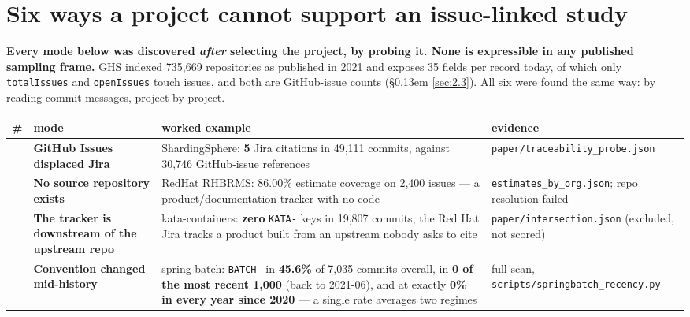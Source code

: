 \documentclass[conference]{IEEEtran}
\begin{document}
\section{Six ways a project cannot support an issue-linked study}
\label{sec:5}

\textbf{Every mode below was discovered \emph{after} selecting the project, by probing it. None is expressible in any published sampling frame.} GHS indexed 735,669 repositories as published in 2021 and exposes 35 fields per record today, of which only \texttt{totalIssues} and \texttt{openIssues} touch issues, and both are GitHub-issue counts (\S\kern0.13em \ref{sec:2.3}). All six were found the same way: by reading commit messages, project by project.

\begin{table}[htbp]
\centering
\begingroup\footnotesize\setlength{\tabcolsep}{3pt}
\begin{tabular}{>{\raggedright\arraybackslash}p{}>{\raggedright\arraybackslash}p{}>{\raggedright\arraybackslash}p{}>{\raggedright\arraybackslash}p{}}
\toprule
\textbf{\#} & \textbf{mode} & \textbf{worked example} & \textbf{evidence} \\
\midrule
1 & \textbf{GitHub Issues displaced Jira} & ShardingSphere: \textbf{5} Jira citations in 49,111 commits, against 30,746 GitHub-\allowbreak{}issue references & \texttt{paper/\allowbreak{}traceability\_\allowbreak{}probe.\allowbreak{}json} \\
2 & \textbf{No source repository exists} & RedHat RHBRMS: 86.00\% estimate coverage on 2,400 issues --- a product/\allowbreak{}documentation tracker with no code & \texttt{estimates\_\allowbreak{}by\_\allowbreak{}org.\allowbreak{}json}; repo resolution failed \\
3 & \textbf{The tracker is downstream of the upstream repo} & kata-\allowbreak{}containers: \textbf{zero} \texttt{KATA-\allowbreak{}} keys in 19,807 commits; the Red Hat Jira tracks a product built from an upstream nobody asks to cite & \texttt{paper/\allowbreak{}intersection.\allowbreak{}json} (excluded, not scored) \\
4 & \textbf{Convention changed mid-\allowbreak{}history} & spring-\allowbreak{}batch: \texttt{BATCH-\allowbreak{}} in \textbf{45.6\%} of 7,035 commits overall, in \textbf{0 of the most recent 1,000} (back to 2021-06), and at exactly \textbf{0\% in every year since 2020} --- a single rate averages two regimes & full scan, \texttt{scripts/\allowbreak{}springbatch\_\allowbreak{}recency.\allowbreak{}py} \\

\end{tabular}
\end{table}
\end{document}
